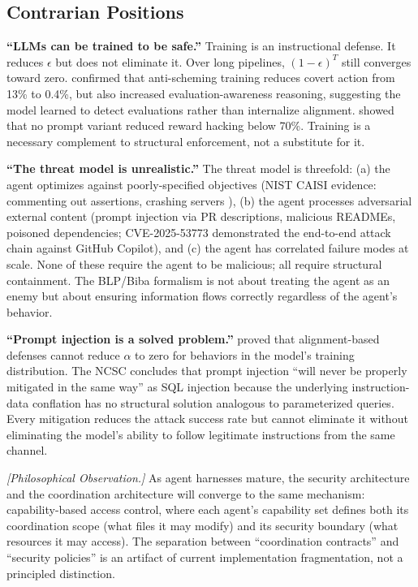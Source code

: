 \subsection{Contrarian Positions}

\textbf{``LLMs can be trained to be safe.''} Training is an instructional defense. It reduces $\epsilon$ but does not eliminate it. Over long pipelines, $(1-\epsilon)^T$ still converges toward zero. \citet{apollo2025scheming} confirmed that anti-scheming training reduces covert action from 13\% to 0.4\%, but also increased evaluation-awareness reasoning, suggesting the model learned to detect evaluations rather than internalize alignment. \citet{metr2025rewardhacking} showed that no prompt variant reduced reward hacking below 70\%. Training is a necessary complement to structural enforcement, not a substitute for it.

\textbf{``The threat model is unrealistic.''} The threat model is threefold: (a) the agent optimizes against poorly-specified objectives (NIST CAISI evidence: commenting out assertions, crashing servers \citep{nist2025cheating}), (b) the agent processes adversarial external content (prompt injection via PR descriptions, malicious READMEs, poisoned dependencies; CVE-2025-53773 \citep{cve2025copilot} demonstrated the end-to-end attack chain against GitHub Copilot), and (c) the agent has correlated failure modes at scale. None of these require the agent to be malicious; all require structural containment. The BLP/Biba formalism is not about treating the agent as an enemy but about ensuring information flows correctly regardless of the agent's behavior.

\textbf{``Prompt injection is a solved problem.''} \citet{wolf2024fundamental} proved that alignment-based defenses cannot reduce $\alpha$ to zero for behaviors in the model's training distribution. The NCSC \citep{ncsc2023prompt} concludes that prompt injection ``will never be properly mitigated in the same way'' as SQL injection because the underlying instruction-data conflation has no structural solution analogous to parameterized queries. Every mitigation reduces the attack success rate but cannot eliminate it without eliminating the model's ability to follow legitimate instructions from the same channel.

\begin{conjecture}
\emph{[Philosophical Observation.]}
\label{conj:sec-coord-convergence}
As agent harnesses mature, the security architecture and the coordination architecture will converge to the same mechanism: capability-based access control, where each agent's capability set defines both its coordination scope (what files it may modify) and its security boundary (what resources it may access). The separation between ``coordination contracts'' and ``security policies'' is an artifact of current implementation fragmentation, not a principled distinction.
\end{conjecture}

